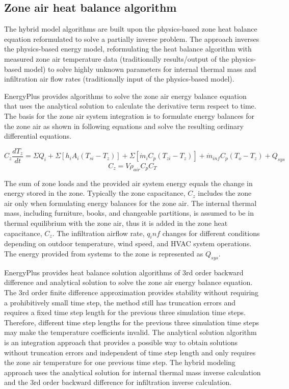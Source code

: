 \subsection{Zone air heat balance algorithm}\label{Zone-air-heat-balance-algorithm}

The hybrid model algorithms are built upon the physics-based zone heat balance equation reformulated to solve a partially inverse problem. The approach inverses the physics-based energy model, reformulating the heat balance algorithm with measured zone air temperature data (traditionally results/output of the physics-based model) to solve highly unknown parameters for internal thermal mass and infiltration air flow rates (traditionally input of the physics-based model).

EnergyPlus provides algorithms to solve the zone air energy balance equation that uses the analytical solution to calculate the derivative term respect to time. The basis for the zone air system integration is to formulate energy balances for the zone air as shown in following equations and solve the resulting ordinary differential equations. 

\begin{equation}
C_z \frac {dT_z} {dt} = \Sigma Q_i +\Sigma[h_i A_i (T_{si} - T_z)] + \Sigma [\dot{m}_i C_p (T_{zi}-T_z)] + \dot{m}_{inf} C_p (T_o - T_z) + Q_{sys}
\end{equation}
\begin{equation}
C_z = V \rho_{air} C_p C_T
\end{equation}

The sum of zone loads and the provided air system energy equals the change in energy stored in the zone. Typically the zone capacitance, $C_z$ includes the zone air only when formulating energy balances for the zone air. The internal thermal mass, including furniture, books, and changeable partitions, is assumed to be in thermal equilibrium with the zone air, thus it is added in the zone heat capacitance, $C_z$.  The infiltration airflow rate, $q_inf$ changes for different conditions depending on outdoor temperature, wind speed, and HVAC system operations. The energy provided from systems to the zone is represented as $Q_{sys}$.

EnergyPlus provides heat balance solution algorithms of 3rd order backward difference and analytical solution to solve the zone air energy balance equation. The 3rd order finite difference approximation provides stability without requiring a prohibitively small time step, the method still has truncation errors and requires a fixed time step length for the previous three simulation time steps. Therefore, different time step lengths for the previous three simulation time steps may make the temperature coefficients invalid. The analytical solution algorithm is an integration approach that provides a possible way to obtain solutions without truncation errors and independent of time step length and only requires the zone air temperature for one previous time step. The hybrid modeling approach uses the analytical solution for internal thermal mass inverse calculation and the 3rd order backward difference for infiltration inverse calculation. 


